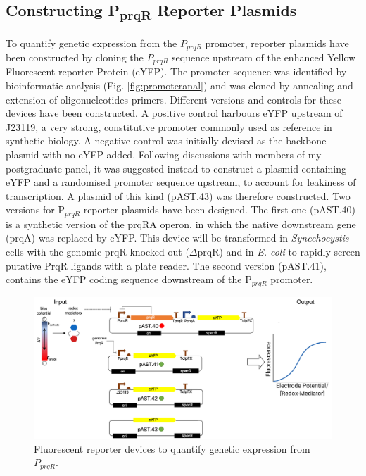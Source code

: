 \subsection{Constructing P\textsubscript{prqR} Reporter Plasmids}
To quantify genetic expression from the $P_{prqR}$ promoter, reporter plasmids have been constructed by cloning the $P_{prqR}$ sequence upstream of the enhanced Yellow Fluorescent reporter Protein (eYFP). The promoter sequence was identified by bioinformatic analysis (Fig. \ref{fig:promoteranal}) and was cloned by annealing and extension of oligonucleotides primers. Different versions and controls for these devices have been constructed. A positive control harbours eYFP upstream of J23119, a very strong, constitutive promoter commonly used as reference in synthetic biology. A negative control was initially devised as the backbone plasmid with no eYFP added. Following discussions with members of my postgraduate panel, it was suggested instead to construct a plasmid containing eYFP and a randomised promoter sequence upstream, to account for leakiness of transcription. A plasmid of this kind (pAST.43) was therefore constructed. Two versions for P$_{prqR}$ reporter plasmids have been designed. The first one (pAST.40) is a synthetic version of the prqRA operon, in which the native downstream gene (prqA) was replaced by eYFP. This device will be transformed in \textit{Synechocystis} cells with the genomic prqR knocked-out ($\Delta$prqR) and in \textit{E. coli} to rapidly screen putative PrqR ligands with a plate reader. The second version (pAST.41), contains the eYFP coding sequence downstream of the P$_{prqR}$ promoter.

\begin{figure}[H]
    \centering
    \includegraphics[width=\hsize]{figs/reporters.png}
    \caption{Fluorescent reporter devices to quantify genetic expression from $P_{prqR}$.}
    \label{fig:reporters}
\end{figure}
\newpage

